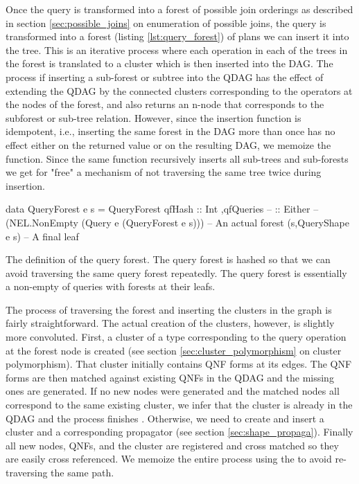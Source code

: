 Once the query is transformed into a forest of possible join orderings as described
in section \ref{sec:possible_joins} on enumeration of possible joins, the query
is transformed into a forest (listing \ref{lst:query_forest}) of plans we
can insert it into the tree. This is an iterative process where each
operation in each of the trees in the forest is translated to a
cluster which is then inserted into the DAG. The process if inserting
a sub-forest or subtree into the QDAG has
the effect of extending the QDAG by the connected clusters
corresponding to the operators at the nodes of the forest, and also
returns an n-node that corresponds to the subforest or sub-tree
relation. However, since the insertion function is idempotent, i.e.,
inserting the same forest in the DAG more than once has no effect
either on the returned value or on the resulting DAG, we memoize the
function. Since the same function recursively inserts all sub-trees
and sub-forests we get for "free" a mechanism of not traversing the
same tree twice during insertion.

\begin{code}
  \begin{haskellcode}
    data QueryForest e s =
      QueryForest
      { qfHash :: Int
        ,qfQueries --
        :: Either --
        (NEL.NonEmpty (Query e (QueryForest e s))) -- An actual forest
        (s,QueryShape e s) -- A final leaf
      }
  \end{haskellcode}
  \label{lst:query_forest}
  \caption{The definition of the query forest. The
    query forest is hashed so that we can avoid traversing the same
    query forest repeatedly. The query forest is essentially a
    non-empty of queries with forests at their leafs.}
\end{code}

The process of traversing the forest and inserting the clusters in the
graph is fairly straightforward. The actual creation of the clusters,
however, is slightly more convoluted. First, a cluster of a type
corresponding to the query operation at the forest node is created
(see section \ref{sec:cluster_polymorphism} on cluster polymorphism). That
cluster initially contains QNF forms at its edges. The QNF forms are
then matched against existing QNFs in the QDAG and the missing ones
are generated. If no new nodes were generated and the matched nodes
all correspond to the same existing cluster, we infer that the cluster
is already in the QDAG and the process finishes . Otherwise, we need to
create and insert a cluster and a corresponding
propagator (see section \ref{sec:shape_propaga}). Finally all new nodes, QNFs, and
the cluster are registered and cross matched so they are easily cross referenced.
We memoize the entire process using the  to avoid re-traversing the same path.

